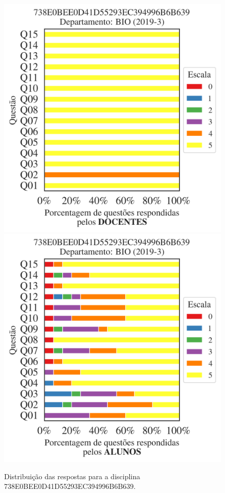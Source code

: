 \documentclass[a4paper,10pt]{article}
\begin{document}
\begin{figure}[h]
\centering
\includegraphics[width=0.485\linewidth]{analise_disciplina_departamento_BIO_738E0BEE0D41D55293EC394996B6B639_docentes.png}
\includegraphics[width=0.485\linewidth]{analise_disciplina_departamento_BIO_738E0BEE0D41D55293EC394996B6B639_alunos.png}
\caption{\label{fig:analise_geral_departamento}                Distribuição das respostas para a disciplina 738E0BEE0D41D55293EC394996B6B639. }
\end{figure}
\end{document}
